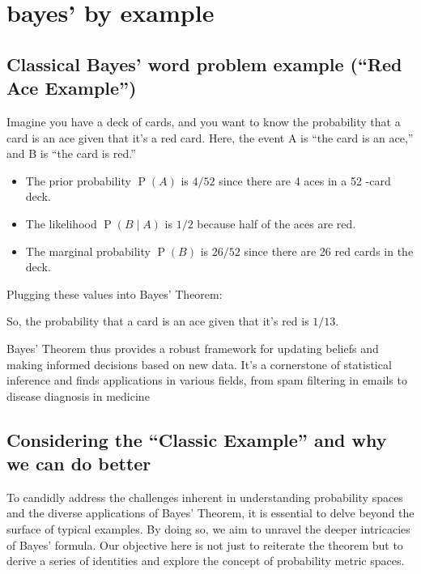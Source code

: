 \documentclass[
  12 pt,
  a4paper,
]{book}
\providecommand{\tightlist}{%
  \setlength{\itemsep}{0pt}\setlength{\parskip}{0pt}}
\numberwithin{equation}{section}
\theoremstyle{plain}      %
\theoremstyle{definition} %
\theoremstyle{remark}     %
\theoremstyle{note}         %
\begin{document}
\newpage

\newpage

\hypertarget{bayes-by-example}{%
\section{bayes' by example}\label{bayes-by-example}}

\hypertarget{classical-bayes-word-problem-example-red-ace-example}{%
\subsection{Classical Bayes' word problem example (``Red Ace
Example'')}\label{classical-bayes-word-problem-example-red-ace-example}}

Imagine you have a deck of cards, and you want to know the probability
that a card is an ace given that it's a red card. Here, the event A is
``the card is an ace,'' and B is ``the card is red.''

\begin{itemize}
\tightlist
\item
  The prior probability \(\operatorname{P}(A)\) is \(4 / 52\) since
  there are 4 aces in a 52 -card deck.
\item
  The likelihood \(\operatorname{P}(B \mid A)\) is \(1 / 2\) because
  half of the aces are red.
\item
  The marginal probability \(\operatorname{P}(B)\) is \(26 / 52\) since
  there are 26 red cards in the deck.
\end{itemize}

Plugging these values into Bayes' Theorem:

So, the probability that a card is an ace given that it's red is
\(1 / 13\).

Bayes' Theorem thus provides a robust framework for updating beliefs and
making informed decisions based on new data. It's a cornerstone of
statistical inference and finds applications in various fields, from
spam filtering in emails to disease diagnosis in medicine

\hypertarget{considering-the-classic-example-and-why-we-can-do-better}{%
\subsection{Considering the ``Classic Example'' and why we can do
better}\label{considering-the-classic-example-and-why-we-can-do-better}}

To candidly address the challenges inherent in understanding probability
spaces and the diverse applications of Bayes' Theorem, it is essential
to delve beyond the surface of typical examples. By doing so, we aim to
unravel the deeper intricacies of Bayes' formula. Our objective here is
not just to reiterate the theorem but to derive a series of identities
and explore the concept of probability metric spaces.
\end{document}
